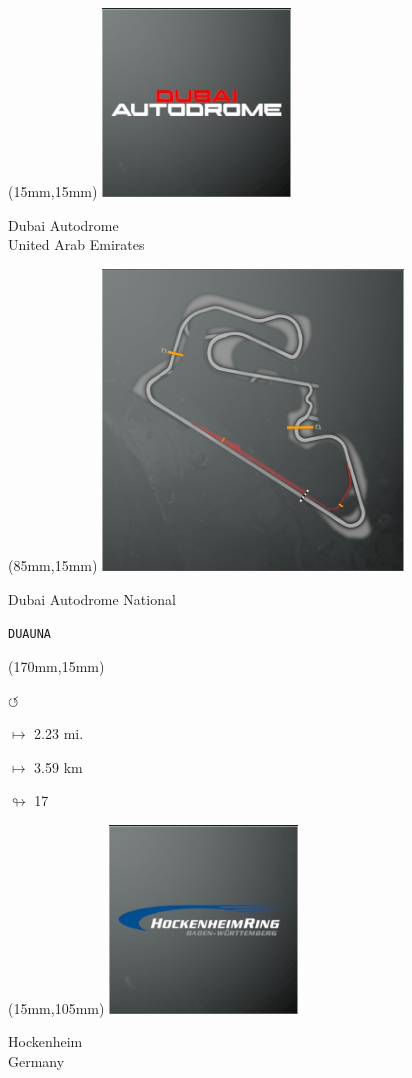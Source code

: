 \begin{textblock*}{60mm}(15mm,15mm)%
\includegraphics[width=50mm]{LG/2015-05-20_00081.png}
\par Dubai Autodrome\\ United Arab Emirates
\end{textblock*}
\begin{textblock*}{80mm}(85mm,15mm)%
\includegraphics[width=80mm]{TR/2015-05-20_00025.png}
\centerline{Dubai Autodrome National}
\par\hfill\tiny\tt DUAUNA\\
\end{textblock*}
\begin{textblock*}{30mm}(170mm,15mm)%
\par \Huge$\circlearrowleft$
\Large
\par$\mapsto$ 2.23 mi.
\par$\mapsto$ 3.59 km
\par$\looparrowright$ 17
\end{textblock*}
\begin{textblock*}{60mm}(15mm,105mm)%
\includegraphics[width=50mm]{LG/2015-05-20_00082.png}
\par Hockenheim\\ Germany
\end{textblock*}
